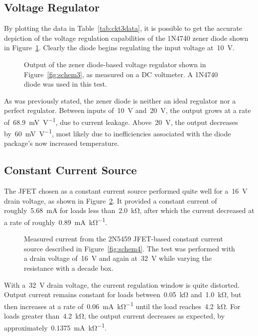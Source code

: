\subsection{Voltage Regulator}
By plotting the data in Table~\ref{tab:ckt3data}, it is possible to get the
accurate depiction of the voltage regulation capabilities of the 1N4740 zener
diode shown in Figure~\ref{fig:ckt3plot}.  Clearly the diode begins regulating
the input voltage at~\SI{10}{\volt}.
%
\begin{figure}[H]
	\centering
	
	\parbox{4.25in}{
	\caption{Output of the zener diode-based voltage regulator shown in
		Figure~\ref{fig:schem3}, as measured on a DC voltmeter.  A 1N4740 diode
		was used in this test.}
	\label{fig:ckt3plot}}
\end{figure}
%
As was previously stated, the zener diode is neither an ideal regulator nor a
perfect regulator.  Between inputs of~\SI{10}{\volt} and~\SI{20}{\volt}, the
output grows at a rate of~\SI{68.9}{\milli\volt\per\volt}, due to current
leakage.  Above~\SI{20}{\volt}, the output decreases
by~\SI{60}{\milli\volt\per\volt}, most likely due to inefficiencies associated
with the diode package's now increased temperature.

\subsection{Constant Current Source}
The JFET chosen as a constant current source performed quite well for
a~\SI{16}{\volt} drain voltage, as shown in Figure~\ref{fig:ckt4plot}.  It
provided a constant current of roughly~\SI{5.68}{\milli\ampere} for loads less
than~\SI{2.0}{\kilo\ohm}, after which the current decreased at a rate of
roughly~\SI{0.89}{\milli\ampere\per\kilo\ohm}.
%
\begin{figure}[H]
	\centering
	
	\parbox{4.25in}{
	\caption{Measured current from the 2N5459 JFET-based constant current
		source described in Figure~\ref{fig:schem4}.  The test was performed
		with a drain voltage of~\SI{16}{\volt} and again at~\SI{32}{\volt}
		while varying the resistance with a decade box.}
	\label{fig:ckt4plot}}
\end{figure}
%
With a~\SI{32}{\volt} drain voltage, the current regulation window is quite
distorted.  Output current remains constant for loads
between~\SI{0.05}{\kilo\ohm} and~\SI{1.0}{\kilo\ohm}, but then increases at a
rate of~\SI{0.06}{\milli\ampere\per\kilo\ohm} until the load
reaches~\SI{4.2}{\kilo\ohm}.  For loads greater than~\SI{4.2}{\kilo\ohm}, the
output current decreases as expected, by
approximately~\SI{.1375}{\milli\ampere\per\kilo\ohm}.

